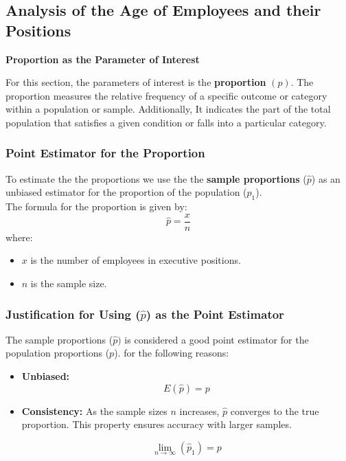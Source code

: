 \documentclass[12pt,a4paper]{article}
\begin{document}
\subsection{Analysis of the Age of Employees and their Positions }
\vspace{1em}

\textbf{Proportion as the Parameter of Interest}

\vspace{1em}

For this section, the parameters of interest is the \textbf{proportion} $(p)$. The proportion measures the relative frequency of a specific outcome or category within a population or sample. Additionally, It indicates the part of the total population that satisfies a given condition or falls into a particular category.

\subsubsection*{Point Estimator for the Proportion}

To estimate the the proportions we use the the \textbf{sample proportions}  (\(\hat{p}\)) as an unbiased estimator for the proportion of the population (\(p_1\)). \\

The formula for the proportion is given by:
\vspace{1em}
\[
\hat{p} = \frac{x}{n}
\]
where:
\begin{itemize}
 \item \(x\)  is the number of employees in executive positions.
  \item \(n\) is the sample size.
\end{itemize}
\subsubsection*{Justification for Using (\(\hat{p}\)) as the Point Estimator}

The sample proportions  (\(\hat{p})\) is considered a good point estimator for the population proportions (\(p\)). for the following reasons:
\begin{itemize}
    \item \textbf{Unbiased:} 
    \[
E(\hat{p}) =  p 
\]
    \item \textbf{Consistency:} As the sample sizes \(n\) increases, \(\hat{p}\) converges to the true proportion. This property ensures accuracy with larger samples.

    \[ \lim_{n \to \infty} \left( \hat{p}_1\right) = p\]
\end{itemize}
\end{document}

